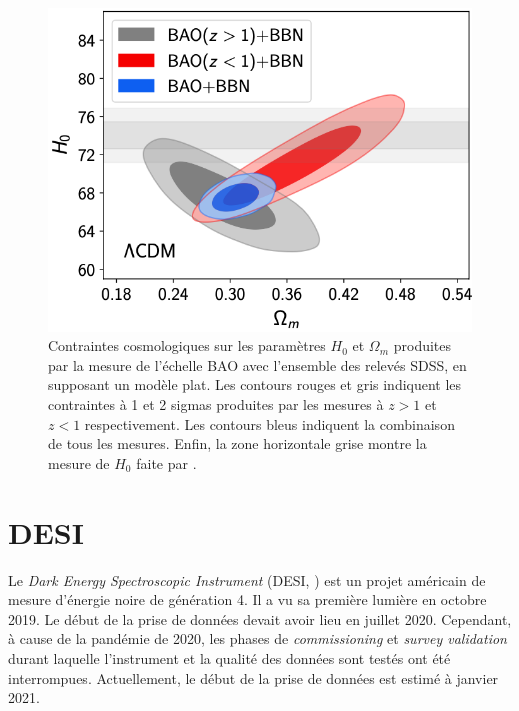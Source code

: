 \begin{figure}
  \centering
  \includegraphics[scale=0.45]{hzero_om}
  \caption{Contraintes cosmologiques sur les paramètres $H_0$ et $\Omega_{m}$ produites par la mesure de l'échelle BAO avec l'ensemble des relevés SDSS, en supposant un modèle \lcdm{} plat. Les contours rouges et gris indiquent les contraintes à 1 et 2 sigmas produites par les mesures à $z > 1$ et $z < 1$ respectivement. Les contours bleus indiquent la combinaison de tous les mesures. Enfin, la zone horizontale grise montre la mesure de $H_0$ faite par \textcite{Riess2019}.}
  \label{fig:h0_om}
\end{figure}


\section{DESI}

Le \emph{Dark Energy Spectroscopic Instrument} (DESI, \textcite{DESICollaboration2016}) est un projet américain de mesure d'énergie noire de génération 4.
Il a vu sa première lumière en octobre 2019. %
Le début de la prise de données devait avoir lieu en juillet 2020. Cependant, à cause de la pandémie de 2020, les phases de \emph{commissioning} et \emph{survey validation} durant laquelle l'instrument et  la qualité des données sont testés ont été interrompues. Actuellement, le début de la prise de données est estimé à janvier 2021.



